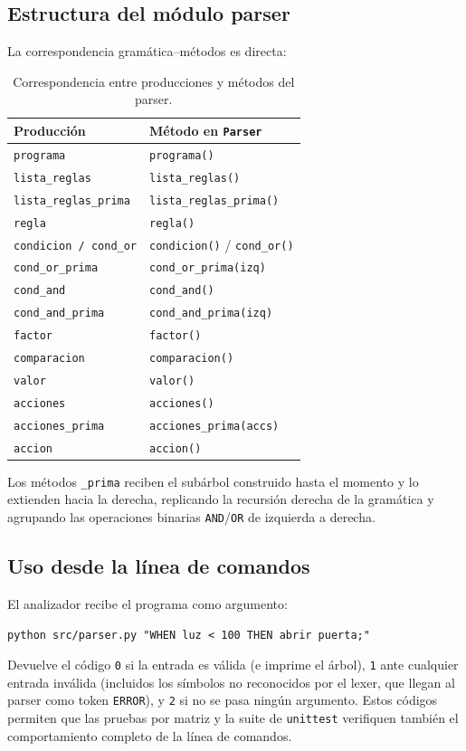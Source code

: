 \documentclass[12pt,a4paper]{article}
\begin{document}
\subsection{Estructura del módulo parser}
La correspondencia gramática--métodos es directa:
\begin{table}[h!]
\centering
\begin{tabular}{ll}
\toprule
\textbf{Producción} & \textbf{Método en \texttt{Parser}} \\
\midrule
\texttt{programa}            & \texttt{programa()} \\
\texttt{lista\_reglas}       & \texttt{lista\_reglas()} \\
\texttt{lista\_reglas\_prima}& \texttt{lista\_reglas\_prima()} \\
\texttt{regla}               & \texttt{regla()} \\
\texttt{condicion / cond\_or}& \texttt{condicion()} / \texttt{cond\_or()} \\
\texttt{cond\_or\_prima}     & \texttt{cond\_or\_prima(izq)} \\
\texttt{cond\_and}           & \texttt{cond\_and()} \\
\texttt{cond\_and\_prima}    & \texttt{cond\_and\_prima(izq)} \\
\texttt{factor}              & \texttt{factor()} \\
\texttt{comparacion}         & \texttt{comparacion()} \\
\texttt{valor}               & \texttt{valor()} \\
\texttt{acciones}            & \texttt{acciones()} \\
\texttt{acciones\_prima}     & \texttt{acciones\_prima(accs)} \\
\texttt{accion}              & \texttt{accion()} \\
\bottomrule
\end{tabular}
\caption{Correspondencia entre producciones y métodos del parser.}
\label{tab:parser-metodos}
\end{table}

Los métodos \texttt{\_prima} reciben el subárbol construido hasta el momento
y lo extienden hacia la derecha, replicando la recursión derecha de la
gramática y agrupando las operaciones binarias \texttt{AND}/\texttt{OR} de
izquierda a derecha.

\subsection{Uso desde la línea de comandos}
El analizador recibe el programa como argumento:
\begin{lstlisting}
python src/parser.py "WHEN luz < 100 THEN abrir puerta;"
\end{lstlisting}
Devuelve el código \texttt{0} si la entrada es válida (e imprime el árbol),
\texttt{1} ante cualquier entrada inválida (incluidos los símbolos no
reconocidos por el lexer, que llegan al parser como token \texttt{ERROR}), y
\texttt{2} si no se pasa ningún argumento. Estos códigos permiten que las
pruebas por matriz y la suite de \texttt{unittest} verifiquen también el
comportamiento completo de la línea de comandos.
\end{document}
